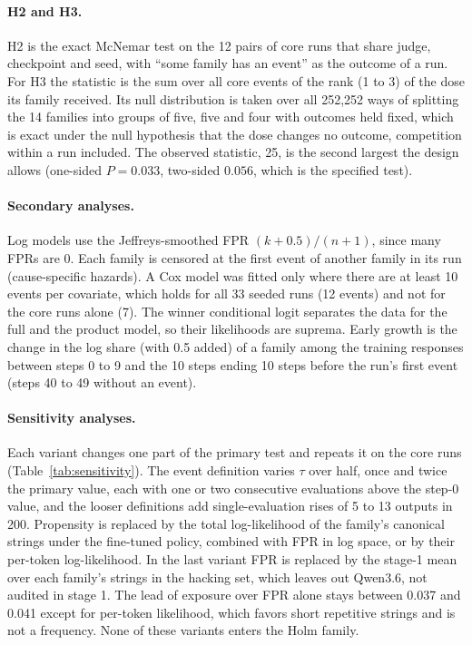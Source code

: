\documentclass[11pt]{article}
\begin{document}
\paragraph{H2 and H3.} H2 is the exact McNemar test on the 12 pairs of core runs that share judge, checkpoint and seed,
with ``some family has an event'' as the outcome of a run. For H3 the statistic is the sum over all core events of
the rank (1 to 3) of the dose its family received. Its null distribution is taken over all 252,252 ways of splitting
the 14 families into groups of five, five and four with outcomes held fixed, which is exact under the null hypothesis
that the dose changes no outcome, competition within a run included. The observed statistic, 25, is the second
largest the design allows (one-sided $P = 0.033$, two-sided $0.056$, which is the specified test).

\paragraph{Secondary analyses.} Log models use the Jeffreys-smoothed FPR $(k + 0.5)/(n + 1)$, since many FPRs are 0.
Each family is censored at the first event of another family in its run (cause-specific hazards). A Cox model was
fitted only where there are at least 10 events per covariate, which holds for all 33 seeded runs (12 events) and not
for the core runs alone (7). The winner conditional logit separates the data for the full and the product model, so
their likelihoods are suprema. Early growth is the change in the log share (with 0.5 added) of a family among the
training responses between steps 0 to 9 and the 10 steps ending 10 steps before the run's first event (steps 40 to 49
without an event).

\paragraph{Sensitivity analyses.} Each variant changes one part of the primary test and repeats it on the core runs
(Table~\ref{tab:sensitivity}). The event definition varies $\tau$ over half, once and twice the primary value, each with
one or two consecutive evaluations above the step-0 value, and the looser definitions add single-evaluation rises of 5 to
13 outputs in 200. Propensity is replaced by the total log-likelihood of the family's canonical strings under the
fine-tuned policy, combined with FPR in log space, or by their per-token log-likelihood. In the last variant FPR is
replaced by the stage-1 mean over each family's strings in the hacking set, which leaves out Qwen3.6, not audited in
stage 1. The lead of
exposure over FPR alone stays between 0.037 and 0.041 except for per-token likelihood, which favors short repetitive
strings and is not a frequency. None of these variants enters the Holm family.
\end{document}
